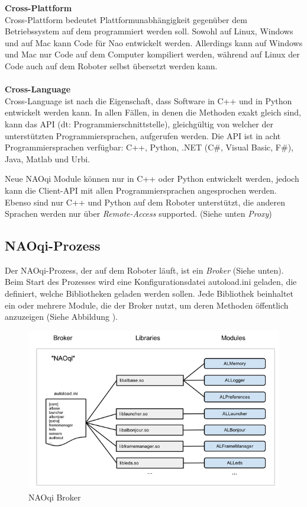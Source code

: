 \textbf{Cross-Plattform}
\\
Cross-Plattform bedeutet Plattformunabhängigkeit gegenüber dem Betriebssystem auf dem programmiert werden soll. Sowohl auf Linux, Windows und auf Mac kann Code für Nao entwickelt werden. Allerdings kann auf Windows und Mac nur Code auf dem Computer kompiliert werden, während auf Linux der Code auch auf dem Roboter selbst übersetzt werden kann.
\\
\\
\textbf{Cross-Language}
\\	
Cross-Language ist nach \cite{ws:naodocu} die Eigenschaft, dass Software in C++ und in Python entwickelt werden kann. In allen Fällen, in denen die Methoden exakt gleich sind, kann das \ac{API} (dt: Programmierschnittstelle), gleichgültig von welcher der unterstützten Programmiersprachen, aufgerufen werden. Die \ac{API} ist in acht Programmiersprachen verfügbar: C++, Python, .NET (C\#, Visual Basic, F\#), Java, Matlab und Urbi.

Neue NAOqi Module können nur in C++ oder Python entwickelt werden, jedoch kann die Client-API mit allen Programmiersprachen angesprochen werden. Ebenso sind nur C++ und Python auf dem Roboter unterstützt, die anderen Sprachen werden nur über \textit{Remote-Access} supported. (Siehe unten \textit{Proxy})
\\
\subsection{NAOqi-Prozess}
Der NAOqi-Prozess, der auf dem Roboter läuft, ist ein \textit{Broker} (Siehe unten). Beim Start des Prozesses wird eine Konfigurationsdatei \textsf{autoload.ini} geladen, die definiert, welche Bibliotheken geladen werden sollen. Jede Bibliothek beinhaltet ein oder mehrere Module, die der Broker nutzt, um deren Methoden öffentlich anzuzeigen (Siehe Abbildung ).

\begin{figure}[H]						
	\centering							
	\includegraphics[scale=0.8]{Bilder/naoqi_process1.PNG}
	\caption{NAOqi Broker}						
	\label{f:naoqi_broker1}						
\end{figure}

